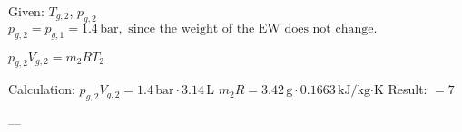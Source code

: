 Given: \( T_{g,2} \), \( p_{g,2} \)  
\( p_{g,2} = p_{g,1} = 1.4 \, \text{bar}, \text{ since the weight of the EW does not change.} \)  

\( p_{g,2} V_{g,2} = m_2 R T_{2} \)  

Calculation:  
\( p_{g,2} V_{g,2} = 1.4 \, \text{bar} \cdot 3.14 \, \text{L} \)  
\( m_2 R = 3.42 \, \text{g} \cdot 0.1663 \, \text{kJ/kg·K} \)  
Result: \( = 7 \)  

---